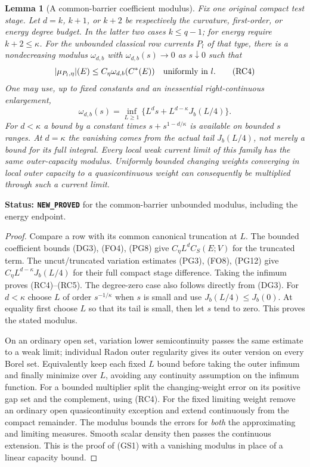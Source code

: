 \documentclass[11pt,a4paper]{article}
\numberwithin{equation}{section}
\newtheorem{lemma}[theorem]{Lemma}
\theoremstyle{definition}
\theoremstyle{remark}
\begin{document}
\begin{lemma}[A common-barrier coefficient modulus]
\label{lem:r11-barrier-coefficient-modulus}
Fix one original compact test stage. Let $d=k$, $k+1$, or
$k+2$ be respectively the curvature, first-order, or energy
degree budget. In the latter two cases $k\leq q-1$;
for energy require $k+2\leq\kappa$. For the unbounded
classical row currents $P_l$ of that type, there is a
nondecreasing modulus $\omega_{d,b}$ with
$\omega_{d,b}(s)\to0$ as $s\downarrow0$ such that
\[
          |\mu_{P_l,\eta}|(E)
                       \leq C_\eta\omega_{d,b}(C^*(E))
                  \quad\hbox{uniformly in }l.
 \tag{RC4}
\]
One may use, up to fixed constants and an inessential
right-continuous enlargement,
\[
 \omega_{d,b}(s)
    =\inf_{L\geq1}\{L^d s+L^{d-\kappa}J_b(L/4)\}.
 \tag{RC5}
\]
For $d<\kappa$ a bound by a constant times
$s+s^{1-d/\kappa}$ is available on bounded $s$ ranges.
At $d=\kappa$ the vanishing comes from the actual tail
$J_b(L/4)$, not merely a bound for its full integral.
Every local weak current limit of this family has the same
outer-capacity modulus. Uniformly bounded changing weights
converging in local outer capacity to a quasicontinuous weight
can consequently be multiplied through such a current limit.
\end{lemma}

\noindent\textbf{Status: \texttt{NEW\_PROVED}} for the
common-barrier unbounded modulus, including the energy endpoint.

\begin{proof}
Compare a row with its common canonical truncation at $L$.
The bounded coefficient bounds (DG3), (FO4), (PG8) give
$C_\eta L^d C_S(E;V)$ for the truncated term.
The uncut/truncated variation estimates (PG3), (FO8), (PG12)
give $C_\eta L^{d-\kappa}J_b(L/4)$ for their full compact
stage difference. Taking the infimum proves (RC4)--(RC5).
The degree-zero case also follows directly from (DG3).
For $d<\kappa$ choose $L$ of order $s^{-1/\kappa}$
when $s$ is small and use $J_b(L/4)\leq J_b(0)$.
At equality first choose $L$ so that its tail is small,
then let $s$ tend to zero. This proves the stated modulus.

On an ordinary open set, variation lower semicontinuity
passes the same estimate to a weak limit; individual Radon
outer regularity gives its outer version on every Borel set.
Equivalently keep each fixed $L$ bound before taking the
outer infimum and finally minimize over $L$, avoiding any
continuity assumption on the infimum function.
For a bounded multiplier split the changing-weight error
on its positive gap set and the complement, using (RC4).
For the fixed limiting weight remove an ordinary open
quasicontinuity exception and extend continuously from the
compact remainder. The modulus bounds the errors for
\emph{both} the approximating and limiting measures.
Smooth scalar density then passes the continuous extension.
This is the proof of (GS1) with a vanishing modulus in place
of a linear capacity bound.
\end{proof}
\end{document}
